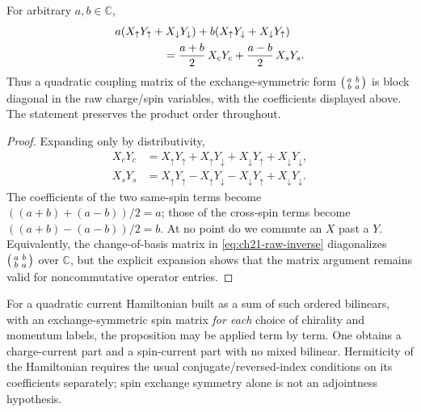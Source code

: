 \begin{proposition}
\label{prop:ch21-quadratic-block}
For arbitrary $a,b\in\mathbb C$,
\begin{align}
 &a(X_\uparrow Y_\uparrow+X_\downarrow Y_\downarrow)
  +b(X_\uparrow Y_\downarrow+X_\downarrow Y_\uparrow)
 \notag\\
 &\hspace{1.5cm}=
  \frac{a+b}{2}\,X_cY_c+
  \frac{a-b}{2}\,X_sY_s.
 \label{eq:ch21-quadratic-block}
\end{align}
Thus a quadratic coupling matrix of the exchange-symmetric form
$\begin{psmallmatrix}a&b\\b&a\end{psmallmatrix}$ is block diagonal
in the raw charge/spin variables, with the coefficients displayed
above.  The statement preserves the product order throughout.
\end{proposition}
\begin{proof}
Expanding only by distributivity,
\begin{align*}
 X_cY_c&=X_\uparrow Y_\uparrow+X_\uparrow Y_\downarrow
          +X_\downarrow Y_\uparrow+X_\downarrow Y_\downarrow,\\
 X_sY_s&=X_\uparrow Y_\uparrow-X_\uparrow Y_\downarrow
          -X_\downarrow Y_\uparrow+X_\downarrow Y_\downarrow.
\end{align*}
The coefficients of the two same-spin terms become
$((a+b)+(a-b))/2=a$; those of the cross-spin terms become
$((a+b)-(a-b))/2=b$.  At no point do we commute an $X$ past a $Y$.
Equivalently, the change-of-basis matrix in
\eqref{eq:ch21-raw-inverse} diagonalizes
$\begin{psmallmatrix}a&b\\b&a\end{psmallmatrix}$ over
$\mathbb C$, but the explicit expansion shows that the matrix
argument remains valid for noncommutative operator entries.
\end{proof}

For a quadratic current Hamiltonian built as a sum of such ordered
bilinears, with an exchange-symmetric spin matrix \emph{for each}
choice of chirality and momentum labels, the proposition may be
applied term by term.  One obtains a charge-current part and a
spin-current part with no mixed bilinear.  Hermiticity of the
Hamiltonian requires the usual conjugate/reversed-index conditions
on its coefficients separately; spin exchange symmetry alone is not
an adjointness hypothesis.

